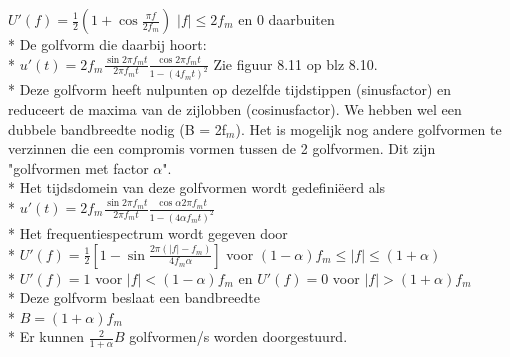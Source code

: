 \documentclass[10pt]{article}
\begin{document}
$U'(f) = \frac{1}{2}\left(1+\cos{\frac{\pi f}{2f_m}}\right)$ $|f|\leq 2f_m$ en 0 daarbuiten\\*
De golfvorm die daarbij hoort:\\*
$u'(t) = 2f_m\frac{\sin{2\pi f_mt}}{2\pi f_mt}\frac{\cos{2\pi f_mt}}{1-(4f_mt)^2}$ {\scriptsize Zie figuur 8.11 op blz 8.10.}\\*
Deze golfvorm heeft nulpunten op dezelfde tijdstippen (sinusfactor) en reduceert de maxima van de zijlobben (cosinusfactor). We hebben wel een dubbele bandbreedte nodig (B = 2f$_m$). Het is mogelijk nog andere golfvormen te verzinnen die een compromis vormen tussen de 2 golfvormen. Dit zijn "golfvormen met factor $\alpha$".\\*
Het tijdsdomein van deze golfvormen wordt gedefini\"eerd als\\*
$u'(t) = 2f_m\frac{\sin{2\pi f_mt}}{2\pi f_mt}\frac{\cos{\alpha 2\pi f_mt}}{1-(4\alpha f_mt)^2}$\\*
Het frequentiespectrum wordt gegeven door\\*
$U'(f) = \frac{1}{2}\left[1-\sin{\frac{2\pi (|f|-f_m)}{4f_m \alpha}}\right]$ voor $(1-\alpha)f_m \leq |f| \leq (1+\alpha)$\\*
$U'(f) = 1$ voor $|f| < (1-\alpha)f_m$ en $U'(f) = 0$ voor $|f| > (1+\alpha)f_m$\\*
Deze golfvorm beslaat een bandbreedte\\*
$B = (1+\alpha)f_m$\\*
Er kunnen $\frac{2}{1+\alpha}B$ golfvormen/s worden doorgestuurd.
\end{document}
